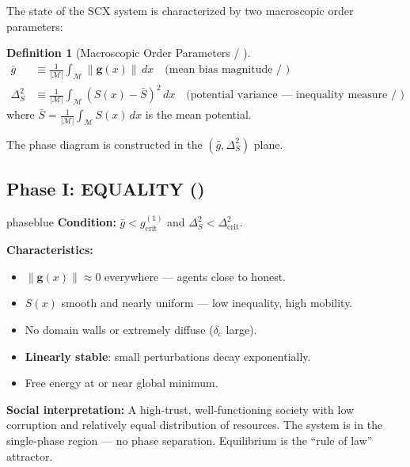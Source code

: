 \documentclass[12pt,a4paper]{article}
\theoremstyle{plain}
\theoremstyle{definition}
\newtheorem{definition}[theorem]{ Definition}
\newcommand{\cM}{\mathcal{M}}
\newcommand{\gf}{\mathbf{g}}          %
\newcommand{\Sf}{S}                   %
\newcommand{\deltac}{\delta_c}        %
\newcommand{\gbar}{\bar{g}}           %
\newcommand{\Sbar}{\bar{S}}           %
\begin{document}
The state of the SCX system is characterized by two macroscopic order parameters:

\begin{definition}[Macroscopic Order Parameters / ]
\label{def:order_params}
\begin{align}
    \gbar &\equiv \frac{1}{|\cM|} \int_\cM \|\gf(x)\| \, dx
    \quad\text{(mean bias magnitude / )}
    \label{eq:mean_bias} \\
    \Delta_S^2 &\equiv \frac{1}{|\cM|} \int_\cM (\Sf(x) - \Sbar)^2 \, dx
    \quad\text{(potential variance — inequality measure / )}
    \label{eq:potential_variance}
\end{align}
where $\Sbar = \frac{1}{|\cM|}\int_\cM \Sf(x)\,dx$ is the mean potential.
\end{definition}

The phase diagram is constructed in the $(\gbar, \Delta_S^2)$ plane.

\subsection{Phase I: EQUALITY ()}

\begin{phasebox}{phaseblue}
\label{phase:equality}
\textbf{Condition:} $\gbar < g_{\text{crit}}^{(1)}$ and $\Delta_S^2 < \Delta_{\text{crit}}^2$.

\textbf{Characteristics:}
\begin{itemize}
    \item $\|\gf(x)\|\approx0$ everywhere — agents close to honest.
    \item $\Sf(x)$ smooth and nearly uniform — low inequality, high mobility.
    \item No domain walls or extremely diffuse ($\deltac$ large).
    \item \textbf{Linearly stable}: small perturbations decay exponentially.
    \item Free energy at or near global minimum.
\end{itemize}

\textbf{Social interpretation:} A high-trust, well-functioning society with
low corruption and relatively equal distribution of resources. The system
is in the single-phase region — no phase separation. Equilibrium is
the ``rule of law'' attractor.
\end{phasebox}

\end{document}
